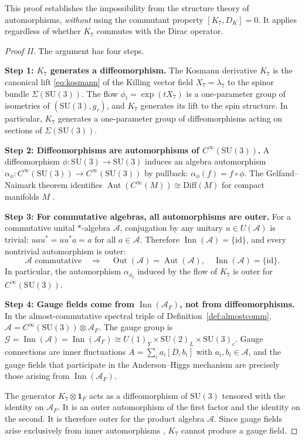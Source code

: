 \documentclass[12pt]{article}
\theoremstyle{definition}
\theoremstyle{remark}
\newcommand{\Alg}{\mathcal{A}}
\newcommand{\Inn}{\operatorname{Inn}}
\newcommand{\Aut}{\operatorname{Aut}}
\newcommand{\Out}{\operatorname{Out}}
\begin{document}
This proof establishes the impossibility from the structure theory of automorphisms, \emph{without} using the commutant property $[K_7, D_K] = 0$.  It applies regardless of whether $K_7$ commutes with the Dirac operator.

\begin{proof}[Proof II]
The argument has four steps.

\medskip\noindent\textbf{Step 1: $K_7$ generates a diffeomorphism.}
The Kosmann derivative $K_7$ is the canonical lift \eqref{eq:kosmann} of the Killing vector field $X_7 = \lambda_7$ to the spinor bundle $\Sigma(\mathrm{SU}(3))$.  The flow $\phi_t = \exp(tX_7)$ is a one-parameter group of isometries of $(\mathrm{SU}(3), g_\tau)$, and $K_7$ generates its lift to the spin structure.  In particular, $K_7$ generates a one-parameter group of diffeomorphisms acting on sections of $\Sigma(\mathrm{SU}(3))$.

\medskip\noindent\textbf{Step 2: Diffeomorphisms are automorphisms of $C^\infty(\mathrm{SU}(3))$.}
A diffeomorphism $\phi : \mathrm{SU}(3) \to \mathrm{SU}(3)$ induces an algebra automorphism $\alpha_\phi : C^\infty(\mathrm{SU}(3)) \to C^\infty(\mathrm{SU}(3))$ by pullback: $\alpha_\phi(f) = f \circ \phi$.  The Gelfand--Naimark theorem identifies $\Aut(C^\infty(M)) \cong \mathrm{Diff}(M)$ for compact manifolds $M$ \cite{Connes1994book}.

\medskip\noindent\textbf{Step 3: For commutative algebras, all automorphisms are outer.}
For a commutative unital $*$-algebra $\Alg$, conjugation by any unitary $u \in U(\Alg)$ is trivial: $u a u^* = u u^* a = a$ for all $a \in \Alg$.  Therefore $\Inn(\Alg) = \{\mathrm{id}\}$, and every nontrivial automorphism is outer:
\begin{equation}\label{eq:inncommutative}
  \Alg \text{ commutative} \quad\Longrightarrow\quad \Out(\Alg) = \Aut(\Alg), \quad \Inn(\Alg) = \{\mathrm{id}\}.
\end{equation}
In particular, the automorphism $\alpha_{\phi_t}$ induced by the flow of $K_7$ is outer for $C^\infty(\mathrm{SU}(3))$.

\medskip\noindent\textbf{Step 4: Gauge fields come from $\Inn(\Alg_F)$, not from diffeomorphisms.}
In the almost-commutative spectral triple of Definition~\ref{def:almostcomm}, $\Alg = C^\infty(\mathrm{SU}(3)) \otimes \Alg_F$.  The gauge group is $\mathcal{G} = \Inn(\Alg) = \Inn(\Alg_F) \cong U(1)_Y \times \mathrm{SU}(2)_L \times \mathrm{SU}(3)_c$.  Gauge connections are inner fluctuations $A = \sum_i a_i [D, b_i]$ with $a_i, b_i \in \Alg$, and the gauge fields that participate in the Anderson--Higgs mechanism are precisely those arising from $\Inn(\Alg_F)$.

The generator $K_7 \otimes \mathbf{1}_F$ acts as a diffeomorphism of $\mathrm{SU}(3)$ tensored with the identity on $\Alg_F$.  It is an outer automorphism of the first factor and the identity on the second.  It is therefore outer for the product algebra $\Alg$.  Since gauge fields arise exclusively from inner automorphisms \cite{Connes1996gravity}, $K_7$ cannot produce a gauge field.
\end{proof}
\end{document}
